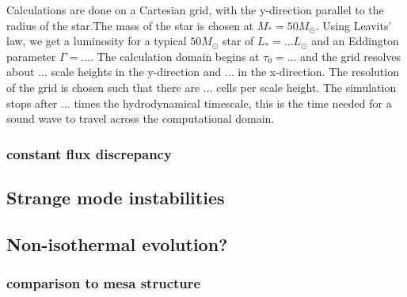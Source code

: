 Calculations are done on a Cartesian grid, with the y-direction parallel to the radius of the star.The mass of the star is chosen at $M_* = 50 M_\odot$. Using Leavits' law, we get a luminosity for a typical $50M_\odot$ star of $L_* = ... L_\odot$ and an Eddington parameter $\Gamma = ...$. The calculation domain begins at $\tau_0 = ...$ and the grid resolves about $...$ scale heights in the y-direction and $...$ in the x-direction. The resolution of the grid is chosen such that there are $...$ cells per scale height. The simulation stops after $...$ times the hydrodynamical timescale, this is the time needed for a sound wave to travel across the computational domain. 

\subsubsection{constant flux discrepancy}

\subsection{Strange mode instabilities}

\subsection{Non-isothermal evolution?}
\subsubsection{comparison to mesa structure}

